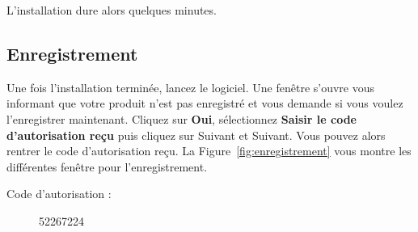 \documentclass[11pt]{article}
\begin{document}
L'installation dure alors quelques minutes.

\subsection{Enregistrement}
Une fois l'installation terminée, lancez le logiciel. Une fenêtre s'ouvre vous informant que votre produit n'est pas enregistré et vous demande si vous voulez l'enregistrer maintenant. Cliquez sur \textbf{Oui}, sélectionnez \textbf{Saisir le code d'autorisation reçu} puis cliquez sur Suivant et Suivant. Vous pouvez alors rentrer le code d'autorisation reçu. La Figure~\ref{fig:enregistrement} vous montre les différentes fenêtre pour l'enregistrement.

\begin{description}
	\item [Code d'autorisation : ] 52267224
\end{description}
\end{document}
